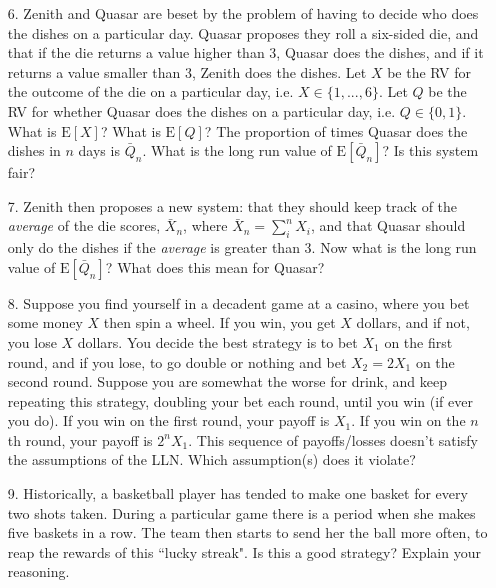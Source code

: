 \documentclass[10pt]{extarticle}
\newcommand{\E}{\text{E}}
\begin{document}
\begin{itemize}

	\item[6.] Zenith and Quasar are beset by the problem of having to decide who does the dishes on a particular day. Quasar proposes they roll a six-sided die, and that if the die returns a value higher than 3, Quasar does the dishes, and if it returns a value smaller than 3, Zenith does the dishes. Let $X$ be the RV for the outcome of the die on a particular day, i.e. $X \in \{1,...,6\}$. Let $Q$ be the RV for whether Quasar does the dishes on a particular day, i.e. $Q \in \{0,1 \}$. What is $\E[X]$? What is $\E[Q]$? The proportion of times Quasar does the dishes in $n$ days is $\bar Q_n$. What is the long run value of $\E[\bar Q_n]$? Is this system fair? \\ 

	\item[7.] Zenith then proposes a new system: that they should keep track of the {\it average} of the die scores, $\bar X_n$, where $\bar X_n = \sum_i^n  X_i$, and that Quasar should only do the dishes if the {\it average} is greater than 3. Now what is the long run value of $\E[\bar Q_n]$? What does this mean for Quasar? \\ 

	\item[8.] Suppose you find yourself in a decadent game at a casino, where you bet some money $X$ then spin a wheel. If you win, you get $X$ dollars, and if not, you lose $X$ dollars. You decide the best strategy is to bet $X_1$ on the first round, and if you lose, to go double or nothing and bet $X_2 = 2X_1$ on the second round. Suppose you are somewhat the worse for drink, and keep repeating this strategy, doubling your bet each round, until you win (if ever you do). If you win on the first round, your payoff is $X_1$. If you win on the $n$th  round, your payoff is $2^n X_1$. This sequence of payoffs/losses doesn't satisfy the assumptions of the LLN. Which assumption(s) does it violate? \\ 

	\item[9.] Historically, a basketball player has tended to make one basket for every two shots taken. During a particular game there is a period when she makes five baskets in a row. The team then starts to send her the ball more often, to reap the rewards of this ``lucky streak". Is this a good strategy? Explain your reasoning.  

\end{itemize}
\end{document}
